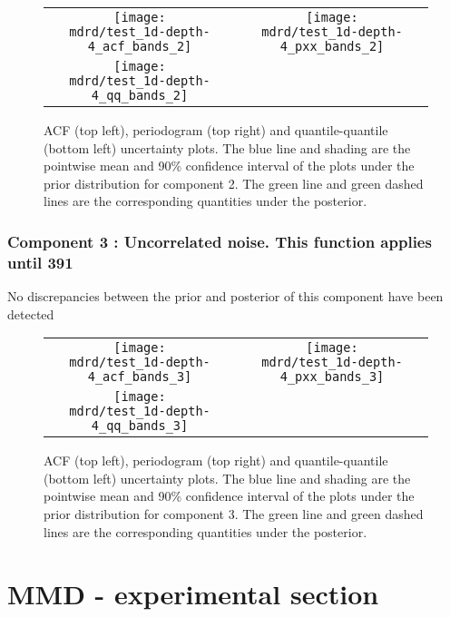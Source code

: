 \documentclass{article} %
\begin{document}
\begin{figure}[H]
\newcommand{\wmgd}{0.5\columnwidth}
\newcommand{\hmgd}{3.0cm}
\newcommand{\mdrd}{test_1d-depth-4}
\newcommand{\mbm}{\hspace{-0.3cm}}
\begin{tabular}{cc}
\mbm \texttt{[image: \\mdrd/test\_1d-depth-4\_acf\_bands\_2]} & \texttt{[image: \\mdrd/test\_1d-depth-4\_pxx\_bands\_2]} \\
\mbm \texttt{[image: \\mdrd/test\_1d-depth-4\_qq\_bands\_2]}
\end{tabular}
\caption{
ACF (top left), periodogram (top right) and quantile-quantile (bottom left) uncertainty plots.
The blue line and shading are the pointwise mean and 90\% confidence interval of the plots under the prior distribution for component 2.
The green line and green dashed lines are the corresponding quantities under the posterior.}
\label{fig:check2}
\end{figure}

\subsubsection{Component 3 : Uncorrelated noise. This function applies until  391}

No discrepancies between the prior and posterior of this component have been detected

\begin{figure}[H]
\newcommand{\wmgd}{0.5\columnwidth}
\newcommand{\hmgd}{3.0cm}
\newcommand{\mdrd}{test_1d-depth-4}
\newcommand{\mbm}{\hspace{-0.3cm}}
\begin{tabular}{cc}
\mbm \texttt{[image: \\mdrd/test\_1d-depth-4\_acf\_bands\_3]} & \texttt{[image: \\mdrd/test\_1d-depth-4\_pxx\_bands\_3]} \\
\mbm \texttt{[image: \\mdrd/test\_1d-depth-4\_qq\_bands\_3]}
\end{tabular}
\caption{
ACF (top left), periodogram (top right) and quantile-quantile (bottom left) uncertainty plots.
The blue line and shading are the pointwise mean and 90\% confidence interval of the plots under the prior distribution for component 3.
The green line and green dashed lines are the corresponding quantities under the posterior.}
\label{fig:check3}
\end{figure}

\section{MMD - experimental section}
\label{sec:mmd}
\end{document}
